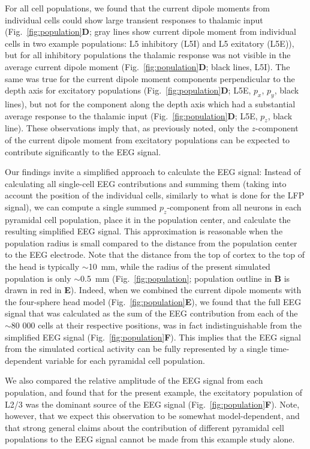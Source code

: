 \documentclass[preprint,10pt,authoryear]{elsarticle}
\begin{document}
For all cell populations, we found that the current dipole moments from individual cells could show large transient responses to thalamic input (Fig.~\ref{fig:population}\textbf{D}; gray lines show current dipole moment from individual cells in two example populations: L5 inhibitory (L5I) and L5 exitatory (L5E)), but for all inhibitory populations the thalamic response was not visible in the average current dipole moment (Fig.~\ref{fig:population}\textbf{D}; black lines, L5I). The same was true for the current dipole moment components perpendicular to the depth axis for excitatory populations (Fig.~\ref{fig:population}\textbf{D}; L5E, $p_x$, $p_y$, black lines), but not for the component along the depth axis which had a substantial average response to the thalamic input (Fig.~\ref{fig:population}\textbf{D}; L5E, $p_z$, black line). 
These observations imply that, as previously noted, only the $z$-component of the current dipole moment from excitatory populations can be expected to contribute significantly to the EEG signal.

Our findings invite a simplified approach to calculate the EEG signal: Instead of calculating all single-cell EEG contributions and summing them (taking into account the position of the individual cells, similarly to what is done for the LFP signal), we can compute a single summed $p_z$-component from all neurons in each pyramidal cell population, place it in the population center, and calculate the resulting simplified EEG signal. This approximation is reasonable when the population radius is small compared to the distance from the population center to the EEG electrode. Note that the distance from the top of cortex to the top of the head is typically $\sim$10~mm, while the radius of the present simulated population is only 
$\sim$0.5~mm (Fig.~\ref{fig:population}; population outline in \textbf{B} is drawn in red in \textbf{E}).
Indeed, when we combined the current dipole moments with the four-sphere head model (Fig.~\ref{fig:population}\textbf{E}), we found that the full EEG signal that was calculated as the sum of the EEG contribution from each of the $\sim$80 000 cells at their respective positions, was in fact indistinguishable from the simplified EEG signal (Fig.~\ref{fig:population}\textbf{F}). This implies that the EEG signal from the simulated cortical activity can be fully represented by a single time-dependent variable for each pyramidal cell population.

We also compared the relative amplitude of the EEG signal from each population, and found that for the present example, the excitatory population of L2/3 was the dominant source of the EEG signal (Fig.~\ref{fig:population}\textbf{F}). Note, however, that we expect this observation to be somewhat model-dependent, and that strong general claims about the contribution of different pyramidal cell populations to the EEG signal cannot be made from this example study alone.
\end{document}

